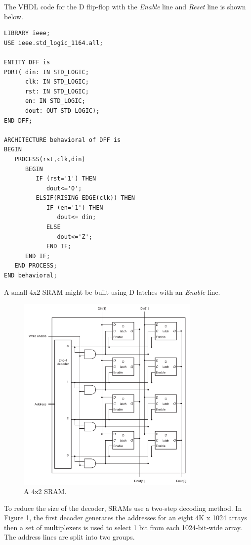 \documentclass[a4paper, 11pt,oneside]{article}
\begin{document}
The VHDL code for the D flip-flop with the \textit{Enable} line and 
\textit{Reset} line is shown below. 

\begin{verbatim}
LIBRARY ieee;
USE ieee.std_logic_1164.all;

ENTITY DFF is
PORT( din: IN STD_LOGIC;
      clk: IN STD_LOGIC;
      rst: IN STD_LOGIC;
      en: IN STD_LOGIC;
      dout: OUT STD_LOGIC);
END DFF;

ARCHITECTURE behavioral of DFF is
BEGIN
   PROCESS(rst,clk,din)
      BEGIN
         IF (rst='1') THEN
            dout<='0';
         ELSIF(RISING_EDGE(clk)) THEN
            IF (en='1') THEN
               dout<= din;
            ELSE
               dout<='Z';
            END IF;
      END IF;
   END PROCESS;
END behavioral;
\end{verbatim}


A small 4x2 SRAM might be built using D latches with an \textit{Enable} line.

\begin{figure}[H]
	\begin{center}
	\includegraphics[width=3.5in]{sram3.png}
	\caption{A 4x2 SRAM.}
	\label{fig:sram2} 
	\end{center}
\end{figure}

To reduce the size of the decoder, SRAMs use a two-step decoding method. In 
Figure \ref{fig:sram2}, the first decoder generates the addresses for an eight 
4K x 1024 arrays then a set of multiplexers is used to select 1 bit from each 
1024-bit-wide array. The address lines are split into two groups.
\end{document}
